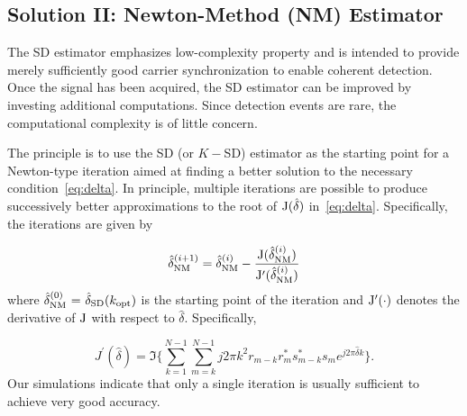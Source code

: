 \subsection{Solution II: Newton-Method (NM) Estimator}

The SD estimator emphasizes low-complexity property and is intended to provide merely sufficiently good carrier synchronization
to enable coherent detection. Once the signal has been acquired, the SD estimator can be improved by 
investing additional computations. Since detection events are rare, the computational complexity is of little concern.

The principle is to use the SD (or $K-$SD) estimator as the starting point for a Newton-type iteration 
aimed at finding a better solution to the necessary condition~\eqref{eq:delta}. 
In principle, multiple iterations are possible to produce successively better approximations to the root of
$\mathrm{J}(\hat{\delta})$ in~\eqref{eq:delta}. Specifically, the iterations are given by

\begin{equation}
    \label{eq:iter_NM_est}
    \hat{\delta}_{\text{NM}}^{(i+1)}=\hat{\delta}_{\text{NM}}^{(i)}-
    \frac{\mathrm{J}(\hat{\delta}_{\text{NM}}^{(i)})}{\mathrm{J}^\prime(\hat{\delta}_{\text{NM}}^{(i)})}
  \end{equation}
where $\hat{\delta}_{\text{NM}}^{(0)}~{=}~\hat{\delta}_{\text{SD}}(k_{\text{opt}})$ is the starting point of the iteration and
$\mathrm{J}^\prime(\cdot)$ denotes the derivative of $\mathrm{J}$ with respect to $\hat{\delta}$. Specifically,

\begin{equation}
    \label{eq:derivative of delta}
    J^\prime(\hat{\delta}) = \Im\bigg\{\sum_{k=1}^{N-1}{\sum_{m=k}^{N-1}{j2\pi k^2r_{m-k}r_m^{*}s_{m-k}^{*}s_m}e^{j2\pi\hat{\delta}k}}\bigg\}.
    \end{equation}
Our simulations indicate that only a single iteration is usually sufficient to achieve very good accuracy.


